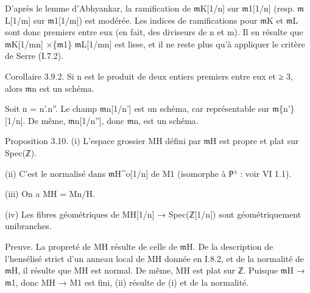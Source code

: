\documentclass[11pt,a4paper]{article}
\begin{document}
D'après le lemme d'Abhyankar, la ramification de \ensuremath{\mathfrak{m}}\textunderscore{}K[1/n] sur \ensuremath{\mathfrak{m}}\textunderscore{}1[1/n] (resp. \ensuremath{\mathfrak{m}}\textunderscore{}L[1/m] sur \ensuremath{\mathfrak{m}}\textunderscore{}1[1/m]) est modérée. Les indices de ramifications pour \ensuremath{\mathfrak{m}}\textunderscore{}K et \ensuremath{\mathfrak{m}}\textunderscore{}L sont donc premiers entre eux (en fait, des diviseurs de n et m). Il en résulte que \ensuremath{\mathfrak{m}}\textunderscore{}K[1/mn] ×\textunderscore{}\{\ensuremath{\mathfrak{m}}\textunderscore{}1\} \ensuremath{\mathfrak{m}}\textunderscore{}L[1/mn] est lisse, et il ne reste plus qu'à appliquer le critère de Serre (I.7.2).

Corollaire 3.9.2. Si n est le produit de deux entiers premiers entre eux et ≥ 3, alors \ensuremath{\mathfrak{m}}\textunderscore{}n est un schéma.

Soit n = n'.n''. Le champ \ensuremath{\mathfrak{m}}\textunderscore{}n[1/n'] est un schéma, car représentable sur \ensuremath{\mathfrak{m}}\textunderscore{}\{n'\}[1/n]. De même, \ensuremath{\mathfrak{m}}\textunderscore{}n[1/n''], donc \ensuremath{\mathfrak{m}}\textunderscore{}n, est un schéma.

Proposition 3.10. (i) L'espace grossier M\textunderscore{}H défini par \ensuremath{\mathfrak{m}}\textunderscore{}H est propre et plat sur Spec(ℤ).

(ii) C'est le normalisé dans \ensuremath{\mathfrak{m}}\textunderscore{}H\textasciicircum{}o[1/n] de M\textunderscore{}1 (isomorphe à ℙ¹ : voir VI 1.1).

(iii) On a M\textunderscore{}H = M\textunderscore{}n/H.

(iv) Les fibres géométriques de M\textunderscore{}H[1/n] → Spec(ℤ[1/n]) sont géométriquement unibranches.

Preuve. La propreté de M\textunderscore{}H résulte de celle de \ensuremath{\mathfrak{m}}\textunderscore{}H. De la description de l'hensélisé strict d'un anneau local de M\textunderscore{}H donnée en I.8.2, et de la normalité de \ensuremath{\mathfrak{m}}\textunderscore{}H, il résulte que M\textunderscore{}H est normal. De même, M\textunderscore{}H est plat sur ℤ. Puisque \ensuremath{\mathfrak{m}}\textunderscore{}H → \ensuremath{\mathfrak{m}}\textunderscore{}1, donc M\textunderscore{}H → M\textunderscore{}1 est fini, (ii) résulte de (i) et de la normalité.
\end{document}
